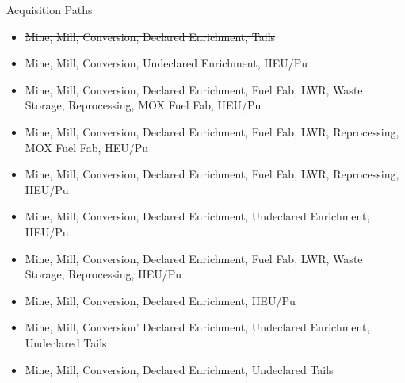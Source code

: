 \begin{frame}{Acquisition Paths}
    \begin{itemize}
        \item \st{Mine, Mill, Conversion, Declared Enrichment, Tails}
        \item Mine, Mill, Conversion, Undeclared Enrichment, HEU/Pu
        \item Mine, Mill, Conversion, Declared Enrichment, Fuel Fab, LWR, Waste Storage, Reprocessing, MOX Fuel Fab, HEU/Pu
        \item Mine, Mill, Conversion, Declared Enrichment, Fuel Fab, LWR, Reprocessing, MOX Fuel Fab, HEU/Pu
        \item Mine, Mill, Conversion, Declared Enrichment, Fuel Fab, LWR, Reprocessing, HEU/Pu
        \item Mine, Mill, Conversion, Declared Enrichment, Undeclared Enrichment, HEU/Pu
        \item Mine, Mill, Conversion, Declared Enrichment, Fuel Fab, LWR, Waste Storage, Reprocessing, HEU/Pu
        \item Mine, Mill, Conversion, Declared Enrichment, HEU/Pu
        \item \st{Mine, Mill, Conversion' Declared Enrichment, Undeclared Enrichment, Undeclared Tails}
        \item \st{Mine, Mill, Conversion, Declared Enrichment, Undeclared Tails}
    \end{itemize}
\end{frame}


